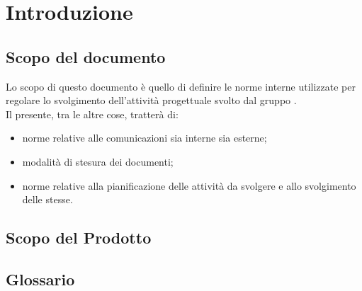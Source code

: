 \section{Introduzione}

\subsection{Scopo del documento}

Lo scopo di questo documento è quello di definire le norme interne utilizzate per regolare lo svolgimento dell'attività progettuale \ProjectName{} svolto dal gruppo \GroupName.\\
Il presente, tra le altre cose, tratterà di:
\begin{itemize}
	\item norme relative alle comunicazioni sia interne sia esterne;
\item modalità di stesura dei documenti;
\item norme relative alla pianificazione delle attività da svolgere e allo svolgimento delle stesse.
\end{itemize}

\subsection{Scopo del Prodotto}
\ScopoDelProdotto

\subsection{Glossario}
\GlossarioIntroduzione






